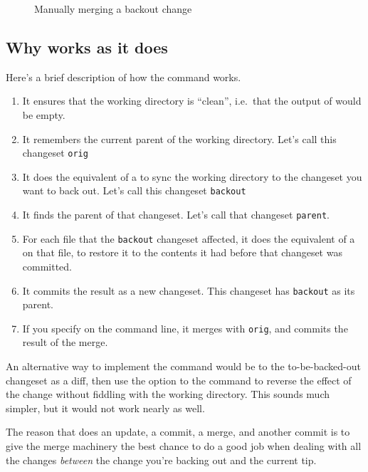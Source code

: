 \begin{figure}[htb]
  \centering
  \caption{Manually merging a backout change}
  \label{fig:undo:backout-manual-merge}
\end{figure}

\subsection{Why  works as it does}

Here's a brief description of how the  command works.
\begin{enumerate}
\item It ensures that the working directory is ``clean'', i.e.~that
  the output of  would be empty.
\item It remembers the current parent of the working directory.  Let's
  call this changeset \texttt{orig}
\item It does the equivalent of a  to sync the working
  directory to the changeset you want to back out.  Let's call this
  changeset \texttt{backout}
\item It finds the parent of that changeset.  Let's call that
  changeset \texttt{parent}.
\item For each file that the \texttt{backout} changeset affected, it
  does the equivalent of a  on that file,
  to restore it to the contents it had before that changeset was
  committed.
\item It commits the result as a new changeset.  This changeset has
  \texttt{backout} as its parent.
\item If you specify  on the command line, it
  merges with \texttt{orig}, and commits the result of the merge.
\end{enumerate}

An alternative way to implement the  command would be
to  the to-be-backed-out changeset as a diff, then use
the  option to the  command to
reverse the effect of the change without fiddling with the working
directory.  This sounds much simpler, but it would not work nearly as
well.

The reason that  does an update, a commit, a merge, and
another commit is to give the merge machinery the best chance to do a
good job when dealing with all the changes \emph{between} the change
you're backing out and the current tip.  

